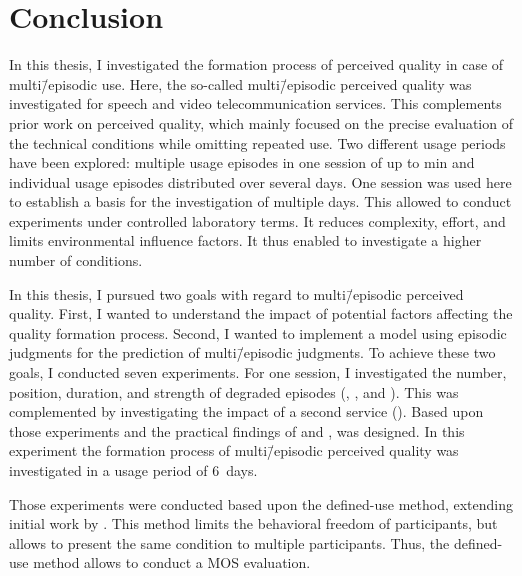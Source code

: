 \chapter{Conclusion}\label{chap:discussion}
In this thesis, I investigated the formation process of perceived quality in case of multi\=/episodic use.
Here, the so-called multi\=/episodic perceived quality was investigated for speech and video telecommunication services.
This complements prior work on perceived quality, which mainly focused on the precise evaluation of the technical conditions while omitting repeated use.
Two different usage periods have been explored: multiple usage episodes in one session of up to \unit[45]{min} and individual usage episodes distributed over several days.
One session was used here to establish a basis for the investigation of multiple days.
This allowed to conduct experiments under controlled laboratory terms.
It reduces complexity, effort, and limits environmental influence factors.
It thus enabled to investigate a higher number of conditions.

In this thesis, I pursued two goals with regard to multi\=/episodic perceived quality.
First, I wanted to understand the impact of potential factors affecting the quality formation process.
Second, I wanted to implement a model using episodic judgments for the prediction of multi\=/episodic judgments.
To achieve these two goals, I conducted seven experiments.
For one session, I investigated the number, position, duration, and strength of degraded episodes (, \EIIa{}, and ).
This was complemented by investigating the impact of a second service (\EIIb{}).
Based upon those experiments and the practical findings of  and ,  was designed.
In this experiment the formation process of multi\=/episodic perceived quality was investigated in a usage period of 6~days.

Those experiments were conducted based upon the defined-use method, extending initial work by \citet{moller_single-call_2011}.
This method limits the behavioral freedom of participants, but allows to present the same condition to multiple participants.
Thus, the defined-use method allows to conduct a \ac{MOS} evaluation.

